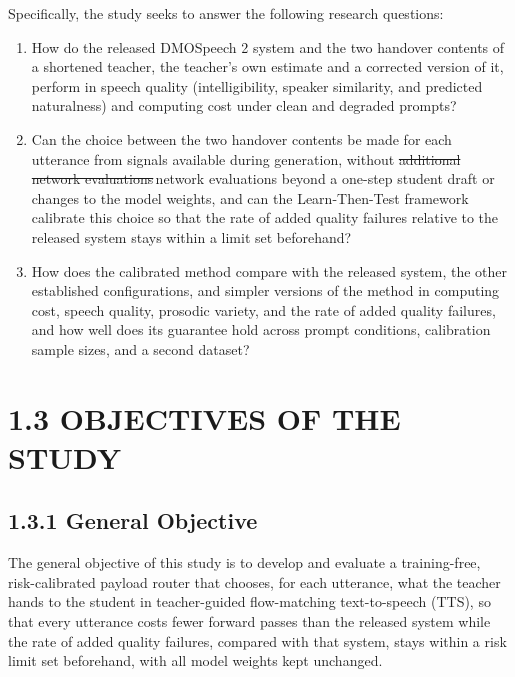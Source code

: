 \documentclass[11pt,a4paper]{article}
\newcommand{\chg}[2]{{\color{delcol}\sout{#1}}\,{\color{addcol}#2}}
\begin{document}
Specifically, the study seeks to answer the following research questions:
\begin{enumerate}
\item How do the released DMOSpeech 2 system and the two handover contents of a shortened teacher, the teacher's own estimate and a corrected version of it, perform in speech quality (intelligibility, speaker similarity, and predicted naturalness) and computing cost under clean and degraded prompts?
\item Can the choice between the two handover contents be made for each utterance from signals available during generation, without \chg{additional network evaluations}{network evaluations beyond a one-step student draft} or changes to the model weights, and can the Learn-Then-Test framework calibrate this choice so that the rate of added quality failures relative to the released system stays within a limit set beforehand?
\item How does the calibrated method compare with the released system, the other established configurations, and simpler versions of the method in computing cost, speech quality, prosodic variety, and the rate of added quality failures, and how well does its guarantee hold across prompt conditions, calibration sample sizes, and a second dataset?
\end{enumerate}

\section*{1.3 OBJECTIVES OF THE STUDY}
\subsection*{1.3.1 General Objective}
The general objective of this study is to develop and evaluate a training-free, risk-calibrated payload router that chooses, for each utterance, what the teacher hands to the student in teacher-guided flow-matching text-to-speech (TTS), so that every utterance costs fewer forward passes than the released system while the rate of added quality failures, compared with that system, stays within a risk limit set beforehand, with all model weights kept unchanged.
\end{document}
